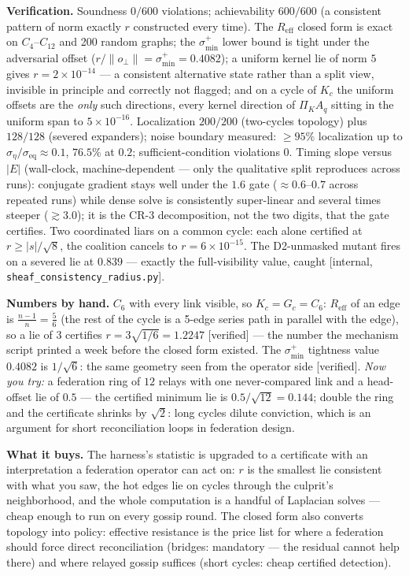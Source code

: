 \documentclass[11pt,a4paper]{article}
\begin{document}
\begin{thebox}
\textbf{Verification.} Soundness $0/600$ violations; achievability $600/600$ (a consistent pattern of norm exactly $r$
constructed every time). The $R_{\mathrm{eff}}$ closed form is exact on $C_4$--$C_{12}$ and 200 random graphs; the
$\sigma^{+}_{\min}$ lower bound is tight under the adversarial offset ($r/\|o_\perp\|=\sigma^{+}_{\min}=0.4082$); a
uniform kernel lie of norm $5$ gives $r=2\times10^{-14}$ --- a consistent alternative state rather than a split view,
invisible in principle and correctly not flagged; and on a cycle of $K_c$ the uniform offsets are the \emph{only} such
directions, every kernel direction of $\Pi_K A_q$ sitting in the uniform span to $5\times10^{-16}$. Localization
$200/200$ (two-cycles topology) plus $128/128$ (severed expanders); noise boundary measured: $\ge95\%$ localization up to
$\sigma_\eta/\sigma_{\mathrm{eq}}\approx0.1$, $76.5\%$ at $0.2$; sufficient-condition violations $0$. Timing slope versus
$|E|$ (wall-clock, machine-dependent --- only the qualitative split reproduces across runs): conjugate gradient stays
well under the $1.6$ gate ($\approx0.6$--$0.7$ across repeated runs) while dense solve is consistently super-linear and
several times steeper ($\gtrsim3.0$); it is the CR-3 decomposition, not the two digits, that the gate certifies. Two
coordinated liars on a common cycle: each alone certified at
$r\ge|s|/\sqrt{8}$, the coalition cancels to $r=6\times10^{-15}$. The D2-unmasked mutant fires on a severed lie at
$0.839$ --- exactly the full-visibility value, caught [internal, \texttt{sheaf\_consistency\_radius.py}].
\end{thebox}

\textbf{Numbers by hand.} $C_6$ with every link visible, so $K_c=G_c=C_6$: $R_{\mathrm{eff}}$ of an edge is
$\tfrac{n-1}{n}=\tfrac56$ (the rest of the cycle is a
5-edge series path in parallel with the edge), so a lie of $3$ certifies $r=3\sqrt{1/6}=1.2247$ [verified] --- the number
the mechanism script printed a week before the closed form existed. The $\sigma^{+}_{\min}$ tightness value $0.4082$ is
$1/\sqrt{6}$: the same geometry seen from the operator side [verified]. \emph{Now you try:} a federation ring of $12$
relays with one never-compared link and a head-offset lie of $0.5$ --- the certified minimum lie is
$0.5/\sqrt{12}=0.144$; double the ring and the certificate shrinks by $\sqrt2$: long cycles dilute conviction, which is an
argument for short reconciliation loops in federation design.



\textbf{What it buys.} The harness's statistic is upgraded to a certificate with an interpretation a federation operator
can act on: $r$ is the smallest lie consistent with what you saw, the hot edges lie on cycles through the culprit's
neighborhood, and the whole computation is a handful of Laplacian solves --- cheap enough to run on every gossip round.
The closed form also converts topology into policy: effective resistance is the price list for where a federation should
force direct reconciliation (bridges: mandatory --- the residual cannot help there) and where relayed gossip suffices
(short cycles: cheap certified detection).
\end{document}
